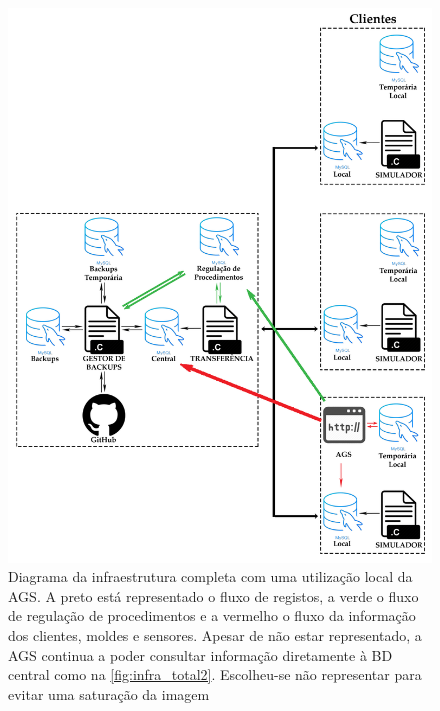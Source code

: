 \documentclass[11pt,twoside,a4paper]{report}
\begin{document}
\begin{figure}
	\vspace{-1cm}
	\begin{center}
		\includegraphics[width=1\textwidth]{Esquema_Projeto_Total03} %
		\caption[Diagrama da infraestrutura completa com uma utilização local da aplicação de gestão do sistema]{Diagrama da infraestrutura completa com uma utilização local da AGS. A preto está representado o fluxo de registos, a verde o fluxo de regulação de procedimentos e a vermelho o fluxo da informação dos clientes, moldes e sensores. Apesar de não estar representado, a AGS continua a poder consultar informação diretamente à BD central como na \autoref{fig:infra_total2}. Escolheu-se não representar para evitar uma saturação da imagem}
		\label{fig:infra_total3}
	\end{center}
\end{figure}
\end{document}
